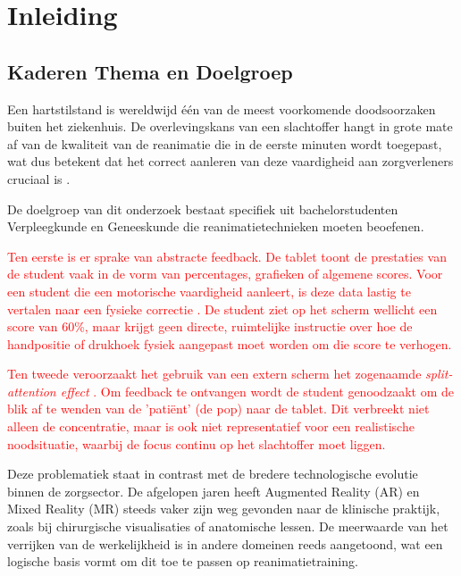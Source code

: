 
\section{Inleiding}%
\label{sec:inleiding}

\subsection{Kaderen Thema en Doelgroep}
Een hartstilstand is wereldwijd één van de meest voorkomende doodsoorzaken buiten het ziekenhuis. 
De overlevingskans van een slachtoffer hangt in grote mate af van de kwaliteit van de reanimatie die in de eerste minuten wordt toegepast, wat dus betekent dat het 
correct aanleren van deze vaardigheid aan zorgverleners cruciaal is \autocite{Olasveengen2021}.

De doelgroep van dit onderzoek bestaat specifiek uit bachelorstudenten Verpleegkunde en Geneeskunde die reanimatietechnieken moeten beoefenen.

\textcolor{red}{Ten eerste is er sprake van abstracte feedback. De tablet toont de prestaties van de student vaak in de vorm van percentages, grafieken of algemene scores. 
Voor een student die een motorische vaardigheid aanleert, is deze data lastig te vertalen naar een fysieke correctie \autocite{Sigrist2013}. 
De student ziet op het scherm wellicht een score van 60\%, maar krijgt geen directe, ruimtelijke instructie over hoe de 
handpositie of drukhoek fysiek aangepast moet worden om die score te verhogen.}

\textcolor{red}{Ten tweede veroorzaakt het gebruik van een extern scherm het zogenaamde \textit{split-attention effect} \autocite{Sigrist2013}. 
Om feedback te ontvangen wordt de student genoodzaakt om de blik af te wenden van de 'patiënt' (de pop) naar de tablet. 
Dit verbreekt niet alleen de concentratie, maar is ook niet representatief voor een realistische noodsituatie, waarbij de focus continu op het slachtoffer moet liggen.}

Deze problematiek staat in contrast met de bredere technologische evolutie binnen de zorgsector. 
De afgelopen jaren heeft Augmented Reality (AR) en Mixed Reality (MR) steeds vaker zijn weg gevonden naar de klinische praktijk, 
zoals bij chirurgische visualisaties of anatomische lessen\autocite{DAngelo2021}. De meerwaarde van het verrijken van de werkelijkheid is in andere domeinen reeds aangetoond, 
wat een logische basis vormt om dit toe te passen op reanimatietraining.

